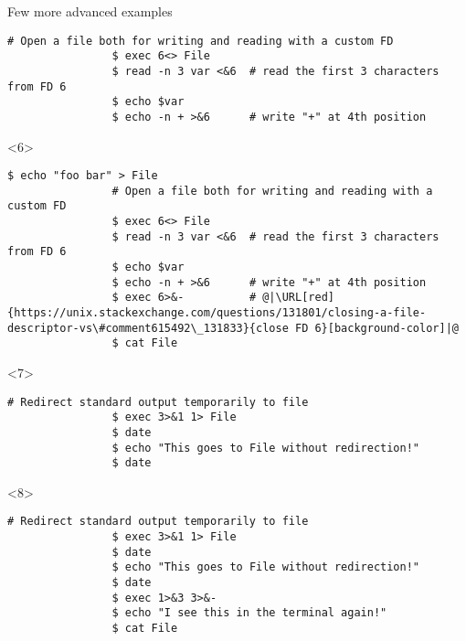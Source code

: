 \begin{frame}[fragile]{Few more advanced examples}
\begin{overlayarea}{\textwidth}{0.34\textheight}
\begin{onlyenv}
\begin{lstlisting}[style=MyBash, numbers=none, xrightmargin=3mm]
                # Open a file both for writing and reading with a custom FD
                $ exec 6<> File
                $ read -n 3 var <&6  # read the first 3 characters from FD 6
                $ echo $var 
                $ echo -n + >&6      # write "+" at 4th position
            \end{lstlisting}
        \end{onlyenv}
        \begin{onlyenv}<6>
            \begin{lstlisting}[style=MyBash, numbers=none, xrightmargin=3mm]
                $ echo "foo bar" > File
                # Open a file both for writing and reading with a custom FD
                $ exec 6<> File
                $ read -n 3 var <&6  # read the first 3 characters from FD 6
                $ echo $var 
                $ echo -n + >&6      # write "+" at 4th position
                $ exec 6>&-          # @|\URL[red]{https://unix.stackexchange.com/questions/131801/closing-a-file-descriptor-vs\#comment615492\_131833}{close FD 6}[background-color]|@
                $ cat File
            \end{lstlisting}
        \end{onlyenv}
        \begin{onlyenv}<7>
            \begin{lstlisting}[style=MyBash, numbers=none, xrightmargin=3mm]
                # Redirect standard output temporarily to file
                $ exec 3>&1 1> File
                $ date
                $ echo "This goes to File without redirection!"
                $ date
            \end{lstlisting}
        \end{onlyenv}
        \begin{onlyenv}<8>
            \begin{lstlisting}[style=MyBash, numbers=none, xrightmargin=3mm]
                # Redirect standard output temporarily to file
                $ exec 3>&1 1> File
                $ date
                $ echo "This goes to File without redirection!"
                $ date
                $ exec 1>&3 3>&-
                $ echo "I see this in the terminal again!"
                $ cat File
            \end{lstlisting}
        \end{onlyenv}
    \end{overlayarea}
    \begin{center}
        \begin{tikzpicture}

\end{tikzpicture}
\end{center}
\end{frame}
